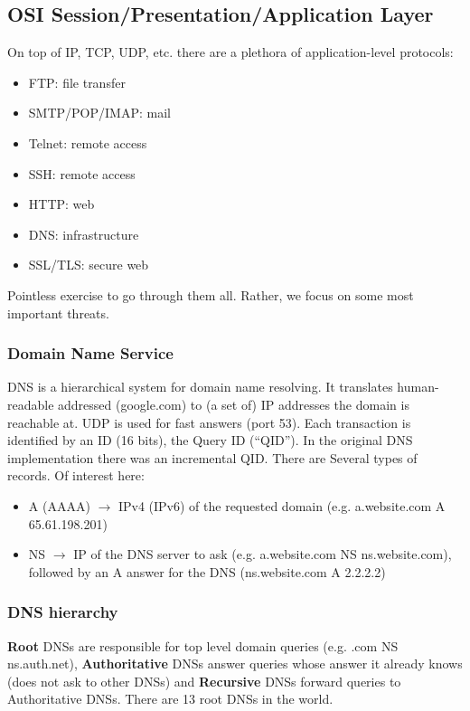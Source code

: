 \documentclass[a4paper, 10pt, titlepage]{article}
\begin{document}

\subsection{OSI Session/Presentation/Application Layer}
On top of IP, TCP, UDP, etc. there are a plethora of application-level protocols:
\begin{itemize}
	\item FTP: file transfer
	\item SMTP/POP/IMAP: mail
	\item Telnet: remote access
	\item SSH: remote access
	\item HTTP: web
	\item DNS: infrastructure
	\item SSL/TLS: secure web
\end{itemize}
Pointless exercise to go through them all. Rather, we focus on some most important threats.

\subsubsection{Domain Name Service}
DNS is a hierarchical system for domain name resolving. It translates human-readable addressed (google.com) to (a set of) IP addresses the domain is reachable at. UDP is used for fast answers (port 53). Each transaction is identified by an ID (16 bits), the Query ID (“QID”). In the original DNS implementation there was an incremental QID. There are Several types of records. Of interest here:
\begin{itemize}
	\item A (AAAA) $\rightarrow$ IPv4 (IPv6) of the requested domain (e.g. a.website.com A 65.61.198.201)
	\item NS $\rightarrow$ IP of the DNS server to ask (e.g. a.website.com NS ns.website.com), followed by an A answer for the DNS (ns.website.com A 2.2.2.2)
\end{itemize}

\subsubsection*{DNS hierarchy}
\textbf{Root} DNSs are responsible for top level domain queries (e.g. .com NS ns.auth.net), \textbf{Authoritative} DNSs answer queries whose answer it already knows (does not ask to other DNSs) and \textbf{Recursive} DNSs forward queries to Authoritative DNSs. There are 13 root DNSs in the world.
\end{document}
